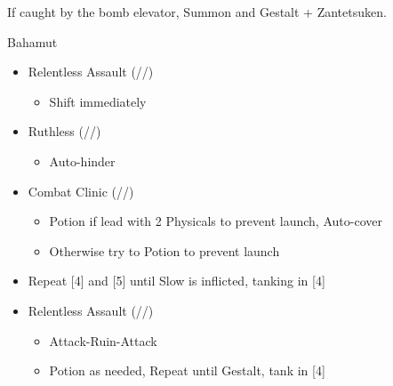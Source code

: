 	If caught by the bomb elevator, Summon and Gestalt + Zantetsuken.
	\vfill
	\renewcommand{\first}{[1] Relentless Assault (\com/\rav/\rav)}
	\renewcommand{\fifth}{[5] Ruthless (\sab/\com/\rav)
		\renewcommand{\fourth}{[4] Combat Clinic (\sen/\med/\med)}}
	\begin{battle}[0:42]{Bahamut}
		\begin{itemize}
			\item \first
			      \begin{itemize}
				      \item Shift immediately
			      \end{itemize}
			\item \fifth
			      \begin{itemize}
				      \item Auto-hinder
			      \end{itemize}
			\item \fourth
			      \begin{itemize}
				      \item Potion if lead with 2 Physicals to prevent launch, Auto-cover
				      \item Otherwise try to Potion to prevent launch
			      \end{itemize}
			\item Repeat [4] and [5] until Slow is inflicted, tanking in [4]
			\item \first
			      \begin{itemize}
				      \item Attack-Ruin-Attack
				      \item Potion as needed, Repeat until Gestalt, tank in [4]
			      \end{itemize}
		\end{itemize}
	\end{battle}
